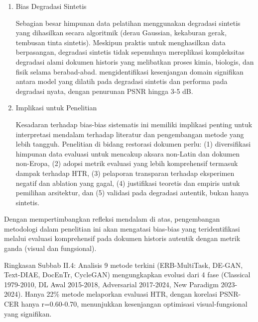 \documentclass[12pt,a4paper]{article}
\begin{document}
\begin{enumerate}[leftmargin=*, labelindent=0pt, itemsep=1ex, topsep=0pt]
Dominasi CNN dalam literatur 2015-2020 dan transisi ke Transformer 2020-sekarang mencerminkan tren riset global dalam pembelajaran mendalam, bukan bukti konklusif superioritas inheren untuk semua kasus penggunaan restorasi dokumen. Penelitian cenderung mengadopsi arsitektur yang sedang populer (\textit{ViT}, \textit{Swin Transformer}) tanpa justifikasi teoretis atau empiris yang kuat untuk dokumen historis spesifik domain. Bias ini dapat mengalihkan perhatian dari pendekatan yang lebih sederhana namun efektif, atau kombinasi yang lebih seimbang antara arsitektur klasik dan modern.

\item Bias Degradasi Sintetis
\label{para:bias-degradasi}

Sebagian besar himpunan data pelatihan menggunakan degradasi sintetis yang dihasilkan secara algoritmik (derau Gaussian, kekaburan gerak, tembusan tinta sintetis). Meskipun praktis untuk menghasilkan data berpasangan, degradasi sintetis tidak sepenuhnya mereplikasi kompleksitas degradasi alami dokumen historis yang melibatkan proses kimia, biologis, dan fisik selama berabad-abad. \parencite{souibgui2022docentr} mengidentifikasi kesenjangan domain signifikan antara model yang dilatih pada degradasi sintetis dan performa pada degradasi nyata, dengan penurunan PSNR hingga 3-5 dB.

\item Implikasi untuk Penelitian
\label{para:bias-implikasi}

Kesadaran terhadap bias-bias sistematis ini memiliki implikasi penting untuk interpretasi mendalam terhadap literatur dan pengembangan metode yang lebih tangguh. Penelitian di bidang restorasi dokumen perlu: (1) diversifikasi himpunan data evaluasi untuk mencakup aksara non-Latin dan dokumen non-Eropa, (2) adopsi metrik evaluasi yang lebih komprehensif termasuk dampak terhadap HTR, (3) pelaporan transparan terhadap eksperimen negatif dan ablation yang gagal, (4) justifikasi teoretis dan empiris untuk pemilihan arsitektur, dan (5) validasi pada degradasi autentik, bukan hanya sintetis.

\end{enumerate}

Dengan mempertimbangkan refleksi mendalam di atas, pengembangan metodologi dalam penelitian ini akan mengatasi bias-bias yang teridentifikasi melalui evaluasi komprehensif pada dokumen historis autentik dengan metrik ganda (visual dan fungsional).

Ringkasan Subbab II.4: Analisis 9 metode terkini (ERB-MultiTask, DE-GAN, Text-DIAE, DocEnTr, CycleGAN) mengungkapkan evolusi dari 4 fase (Classical 1979-2010, DL Awal 2015-2018, Adversarial 2017-2024, New Paradigm 2023-2024). Hanya 22\% metode melaporkan evaluasi HTR, dengan korelasi PSNR-CER hanya r=0.60-0.70, menunjukkan kesenjangan optimisasi visual-fungsional yang signifikan.
\end{document}
